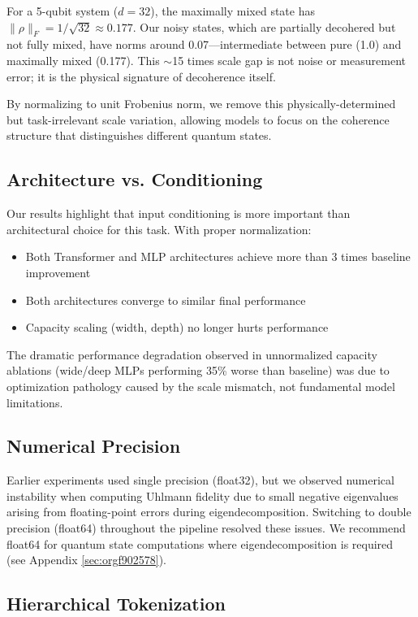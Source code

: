 \documentclass[11pt]{article}
\begin{document}
For a 5-qubit system (\(d = 32\)), the maximally mixed state has \(\|\rho\|_F = 1/\sqrt{32} \approx 0.177\). Our noisy states, which are partially decohered but not fully mixed, have norms around 0.07---intermediate between pure (1.0) and maximally mixed (0.177). This \(\sim\)15 times scale gap is not noise or measurement error; it is the physical signature of decoherence itself.

By normalizing to unit Frobenius norm, we remove this physically-determined but task-irrelevant scale variation, allowing models to focus on the coherence structure that distinguishes different quantum states.

\subsection{Architecture vs. Conditioning}
\label{sec:org33a7536}

Our results highlight that input conditioning is more important than architectural choice for this task. With proper normalization:
\begin{itemize}
\item Both Transformer and MLP architectures achieve more than 3 times baseline improvement
\item Both architectures converge to similar final performance
\item Capacity scaling (width, depth) no longer hurts performance
\end{itemize}

The dramatic performance degradation observed in unnormalized capacity ablations (wide/deep MLPs performing 35\% worse than baseline) was due to optimization pathology caused by the scale mismatch, not fundamental model limitations.

\subsection{Numerical Precision}
\label{sec:orge162a89}

Earlier experiments used single precision (float32), but we observed numerical instability when computing Uhlmann fidelity due to small negative eigenvalues arising from floating-point errors during eigendecomposition. Switching to double precision (float64) throughout the pipeline resolved these issues. We recommend float64 for quantum state computations where eigendecomposition is required (see Appendix \ref{sec:orgf902578}).

\subsection{Hierarchical Tokenization}
\label{sec:org344a299}
\end{document}
